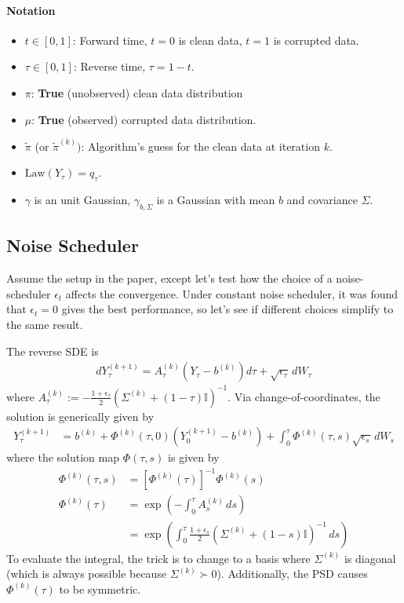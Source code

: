 \documentclass[12pt,fleqn]{article}
\numberwithin{equation}{section}
\begin{document}
\paragraph{Notation}
\begin{itemize}
	\item $t \in [0,1]$: Forward time, $t=0$ is clean data, $t = 1$ is corrupted data.
	\item $\tau \in [0,1]$: Reverse time, $\tau = 1 - t$.
	\item $\pi$: \textbf{True} (unobserved) clean data distribution
	\item $\mu$: \textbf{True} (observed) corrupted data distribution.
	\item $\tilde \pi$ (or $\tilde \pi^{(k)})$: Algorithm's guess for the clean data at iteration $k$.
	\item $\text{Law}(Y_\tau) = q_\tau$.
	\item $\gamma$ is an unit Gaussian, $\gamma_{b,\Sigma}$ is a Gaussian with mean $b$ and covariance $\Sigma$.
\end{itemize}

\subsection{Noise Scheduler}
Assume the setup in the paper, except let's test how the choice of a noise-scheduler $\epsilon_t$ affects the convergence. Under constant noise scheduler, it was found that $\epsilon_t = 0$ gives the best performance, so let's see if different choices simplify to the same result.

The reverse SDE is
\begin{align}
	dY_\tau^{(k+1)} = A_\tau^{(k)} (Y_\tau - b^{(k)}) d\tau + \sqrt{\epsilon_\tau} \, dW_\tau
\end{align}
where $A_\tau^{(k)} := -\frac{1 + \epsilon_\tau}{2} (\Sigma^{(k)} + (1-\tau) \mathbb I)^{-1}$. Via change-of-coordinates, the solution is generically given by
\begin{align}
	Y_\tau^{(k+1)} & = b^{(k)} + \Phi^{(k)}(\tau, 0) (Y_0^{(k+1)} -  b^{(k)}) + \int_0^\tau \Phi^{(k)}(\tau, s) \sqrt{\epsilon_s} \, dW_s \label{eqn:solution}
\end{align}
where the solution map $\Phi(\tau,s)$ is given by
\begin{align}
	\Phi^{(k)}(\tau, s) &  = [\Phi^{(k)}(\tau)]^{-1} \Phi^{(k)}(s)\\
	\Phi^{(k)}(\tau)  & =  \exp\left( - \int_0^\tau A_s^{(k)}\, ds \right) \\ 
	& = \exp \left(  \int_0^\tau \frac{1 + \epsilon_s}{2} (\Sigma^{(k)} + (1-s) \mathbb I)^{-1} \, ds \right)
\end{align}
To evaluate the integral, the trick is to change to a basis where $\Sigma^{(k)}$ is diagonal (which is always possible because $\Sigma^{(k)} \succ 0$). Additionally, the PSD causes $\Phi^{(k)}(\tau)$ to be symmetric.
\end{document}
